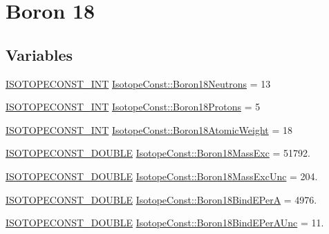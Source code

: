 \hypertarget{group___isotope_const-_boron-_b18}{}\section{Boron 18}
\label{group___isotope_const-_boron-_b18}
\subsection*{Variables}
\begin{DoxyCompactItemize}
\item 
\mbox{\hyperlink{group___isotope_const-_macros_ga5f18360b3e99483a35c32d789e62621c}{I\+S\+O\+T\+O\+P\+E\+C\+O\+N\+S\+T\+\_\+\+I\+NT}} \mbox{\hyperlink{group___isotope_const-_boron-_b18_ga97b44bb88338353e28adb82dce76cd4f}{Isotope\+Const\+::\+Boron18\+Neutrons}} = 13
\item 
\mbox{\hyperlink{group___isotope_const-_macros_ga5f18360b3e99483a35c32d789e62621c}{I\+S\+O\+T\+O\+P\+E\+C\+O\+N\+S\+T\+\_\+\+I\+NT}} \mbox{\hyperlink{group___isotope_const-_boron-_b18_gad89ea647843f810ff844dd07f010744e}{Isotope\+Const\+::\+Boron18\+Protons}} = 5
\item 
\mbox{\hyperlink{group___isotope_const-_macros_ga5f18360b3e99483a35c32d789e62621c}{I\+S\+O\+T\+O\+P\+E\+C\+O\+N\+S\+T\+\_\+\+I\+NT}} \mbox{\hyperlink{group___isotope_const-_boron-_b18_gaf2f234395ab7214b3b8d5a8a65c2b787}{Isotope\+Const\+::\+Boron18\+Atomic\+Weight}} = 18
\item 
\mbox{\hyperlink{group___isotope_const-_macros_ga8f45a7272ce02c0b4c65c44636ed719a}{I\+S\+O\+T\+O\+P\+E\+C\+O\+N\+S\+T\+\_\+\+D\+O\+U\+B\+LE}} \mbox{\hyperlink{group___isotope_const-_boron-_b18_ga98d9da5ea146226c99fa983ffd34ab7c}{Isotope\+Const\+::\+Boron18\+Mass\+Exc}} = 51792.
\item 
\mbox{\hyperlink{group___isotope_const-_macros_ga8f45a7272ce02c0b4c65c44636ed719a}{I\+S\+O\+T\+O\+P\+E\+C\+O\+N\+S\+T\+\_\+\+D\+O\+U\+B\+LE}} \mbox{\hyperlink{group___isotope_const-_boron-_b18_gaaf85dffc730ffa4c50039ef8de06b17e}{Isotope\+Const\+::\+Boron18\+Mass\+Exc\+Unc}} = 204.
\item 
\mbox{\hyperlink{group___isotope_const-_macros_ga8f45a7272ce02c0b4c65c44636ed719a}{I\+S\+O\+T\+O\+P\+E\+C\+O\+N\+S\+T\+\_\+\+D\+O\+U\+B\+LE}} \mbox{\hyperlink{group___isotope_const-_boron-_b18_ga90d5360a93ab68c570e6b0fb18944fa2}{Isotope\+Const\+::\+Boron18\+Bind\+E\+PerA}} = 4976.
\item 
\mbox{\hyperlink{group___isotope_const-_macros_ga8f45a7272ce02c0b4c65c44636ed719a}{I\+S\+O\+T\+O\+P\+E\+C\+O\+N\+S\+T\+\_\+\+D\+O\+U\+B\+LE}} \mbox{\hyperlink{group___isotope_const-_boron-_b18_ga33457b8f5a377db3eb80ad4c755a6226}{Isotope\+Const\+::\+Boron18\+Bind\+E\+Per\+A\+Unc}} = 11.

\end{DoxyCompactItemize}
